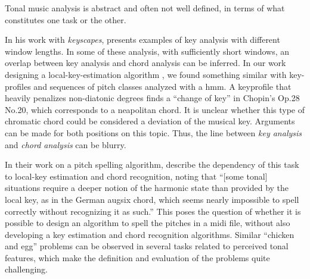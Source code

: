 

Tonal music analysis is abstract and often not well defined,
in terms of what constitutes one task or the other.


In his work with \emph{keyscapes},
\textcite{sapp2011computational} presents examples of key
analysis with different window lengths. In some of these
analysis, with sufficiently short windows, an overlap
between key analysis and chord analysis can be inferred. In
our work designing a local-key-estimation algorithm
\parencite{napoleslopez2019keyfinding}, we found something
similar with key-profiles and sequences of pitch classes
analyzed with a \gls{hmm}. A \gls{keyprofile} that heavily
penalizes non-diatonic degrees finds a ``change of key'' in
Chopin's Op.28 No.20, which corresponds to a
\gls{neapolitan} chord. It is unclear whether this type of
chromatic chord could be considered a deviation of the
musical key. Arguments can be made for both positions on
this topic. Thus, the line between \emph{key analysis} and
\emph{chord analysis} can be blurry.


In their work on a pitch spelling algorithm,
\textcite{teodoru2007pitch} describe the dependency of this
task to local-key estimation and chord recognition, noting
that ``[some tonal] situations require a deeper notion of
the harmonic state than provided by the local key, as in the
German \gls{augsix} chord, which seems nearly impossible to
spell correctly without recognizing it as such.'' This poses
the question of whether it is possible to design an
algorithm to spell the pitches in a \gls{midi} file, without
also developing a key estimation and chord recognition
algorithms. Similar ``chicken and egg'' problems can be
observed in several tasks related to perceived tonal
features, which make the definition and evaluation of the
problems quite challenging.

